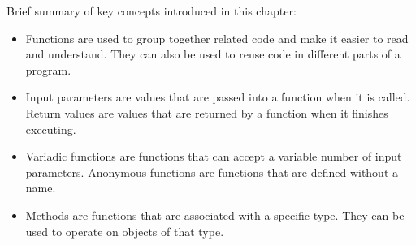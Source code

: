 Brief summary of key concepts introduced in this chapter:

\begin{itemize}

\item Functions are used to group together related code and make it easier to read and
  understand. They can also be used to reuse code in different parts of a
  program.

\item Input parameters are values that are passed into a function when it is called.
  Return values are values that are returned by a function when it finishes
  executing.

\item Variadic functions are functions that can accept a variable number of input
  parameters. Anonymous functions are functions that are defined without a name.

\item Methods are functions that are associated with a specific type. They can be used
  to operate on objects of that type.

\end{itemize}
